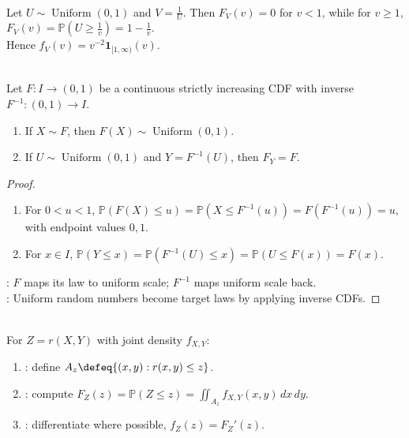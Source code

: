 \begin{example} \label{ex:reciprocal-uniform-density} \\
Let $U\sim\operatorname{Uniform}(0,1)$ and $V=\frac{1}{U}$. Then $F_V(v)=0$ for $v<1$, while for $v\geq1$, $F_V(v)=\mathbb{P}(U\geq\frac{1}{v})=1-\frac{1}{v}$.\\
Hence $f_V(v)=v^{-2}\mathbf{1}_{[1,\infty)}(v)$.
\end{example}

\begin{proposition} \label{prop:probability-integral-and-inverse-transform} \\
Let $F:I\to(0,1)$ be a continuous strictly increasing CDF with inverse $F^{-1}:(0,1)\to I$.
\begin{enumerate}[label=(\roman*)]
\setlength{\itemsep}{0pt}
\item If $X\sim F$, then $F(X)\sim\operatorname{Uniform}(0,1)$.
\item If $U\sim\operatorname{Uniform}(0,1)$ and $Y=F^{-1}(U)$, then $F_Y=F$.
\end{enumerate}
\begin{proof}
\begin{enumerate}[label=(\roman*)]
\setlength{\itemsep}{0pt}
\item For $0<u<1$, $\mathbb{P}(F(X)\leq u)=\mathbb{P}(X\leq F^{-1}(u))=F(F^{-1}(u))=u$, with endpoint values $0,1$.
\item For $x\in I$, $\mathbb{P}(Y\leq x)=\mathbb{P}(F^{-1}(U)\leq x)=\mathbb{P}(U\leq F(x))=F(x)$.
\end{enumerate}
: $F$ maps its law to uniform scale; $F^{-1}$ maps uniform scale back.\\
: Uniform random numbers become target laws by applying inverse CDFs.
\end{proof}
\end{proposition}

\begin{method} \label{meth:several-variable-transformation-cdf-method} \\
For $Z=r(X,Y)$ with joint density $f_{X,Y}$:
\begin{enumerate}[label=(\roman*)]
\setlength{\itemsep}{0pt}
\item {}: define $A_z\defeq\{(x,y):r(x,y)\leq z\}$.
\item {}: compute $F_Z(z)=\mathbb{P}(Z\leq z)=\iint_{A_z}f_{X,Y}(x,y)\,dx\,dy$.
\item {}: differentiate where possible, $f_Z(z)=F_Z'(z)$.
\end{enumerate}
\end{method}

